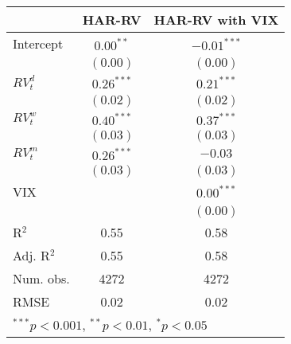
\begin{tabular}{l c c }
\hline
 & HAR-RV & HAR-RV with VIX \\
\hline
Intercept    & $0.00^{**}$  & $-0.01^{***}$ \\
             & $(0.00)$     & $(0.00)$      \\
$RV_{t}^{d}$ & $0.26^{***}$ & $0.21^{***}$  \\
             & $(0.02)$     & $(0.02)$      \\
$RV_{t}^{w}$ & $0.40^{***}$ & $0.37^{***}$  \\
             & $(0.03)$     & $(0.03)$      \\
$RV_{t}^{m}$ & $0.26^{***}$ & $-0.03$       \\
             & $(0.03)$     & $(0.03)$      \\
VIX          &              & $0.00^{***}$  \\
             &              & $(0.00)$      \\
\hline
R$^2$        & 0.55         & 0.58          \\
Adj. R$^2$   & 0.55         & 0.58          \\
Num. obs.    & 4272         & 4272          \\
RMSE         & 0.02         & 0.02          \\
\hline
\multicolumn{3}{l}{\scriptsize{$^{***}p<0.001$, $^{**}p<0.01$, $^*p<0.05$}}
\end{tabular}
